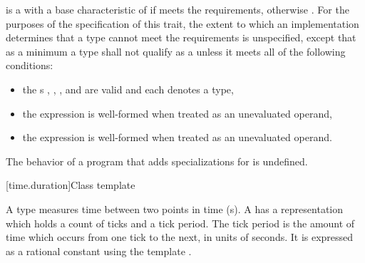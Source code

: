 \pnum
{} is a 
with a base characteristic of 
if  meets the  requirements,
otherwise .
For the purposes of the specification of this trait,
the extent to which an implementation determines
that a type cannot meet the  requirements is unspecified,
except that as a minimum
a type  shall not qualify as a 
unless it meets all of the following conditions:
\begin{itemize}
\item the s
,
,
, and
are valid and each denotes a type,
\item the expression
is well-formed when treated as an unevaluated operand,
\item the expression
is well-formed when treated as an unevaluated operand.
\end{itemize}

\pnum
The behavior of a program that adds specializations for  is undefined.

[time.duration]{Class template }

\pnum
A  type measures time between two points in time (s).
A  has a representation which holds a count of ticks and a tick period.
The tick period is the amount of time which occurs from one tick to the next, in units
of seconds. It is expressed as a rational constant using the template .

